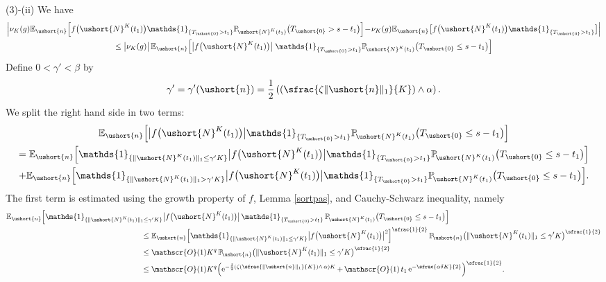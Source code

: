\documentclass[10pt]{amsart}
\newcommand{\Psfrac}[2]{(\sfrac{#1}{#2})}
\let\mathcal\mathscr
\numberwithin{equation}{section}
\theoremstyle{plain}
\theoremstyle{definition}
\newcommand{\proba}{{\mathbb{P}}}
\newcommand{\E}{{\mathbb{E}}}
\newcommand{\Oun}{\mathcal{O}(1)}
\newcommand{\un}{\mathds{1}}
\newcommand{\vecn}{\ushort{n}}
\newcommand{\veczer}{\ushort{0}}
\newcommand{\leproc}{\ushort{N}^{K}}
\newcommand{\sleproc}{\ushort{N}^{K}}
\newcommand{\nuk}{\nu_{K}}\let\snuk\nuk
\newcommand{\e}{\operatorname{e}}
\newcommand{\norm}[1]{\|#1\|_{1}}\let\snorm\norm
\begin{document}
(3)-(ii) We have
\begin{multline*}
\Bigl|\nuk(g) \E_{\vecn}\Bigl[
f\bigl(\leproc(t_{1})\bigr)\un_{\{T_{\veczer}>t_{1}\}}
\proba_{\!\sleproc(t_{1})}\bigl(T_{\veczer}>s-t_{1}\bigr)\Bigr]\!-\!\nuk(g) \E_{\vecn}\bigl[f\bigl(\leproc(t_{1})\bigr)\un_{\{T_{\veczer}>t_{1}\}}\bigr]\Bigr|\\
\le \big|\nuk(g)\big|\, \E_{\vecn}\Bigl[
\big|f\bigl(\leproc(t_{1})\bigr)\big|\;\un_{\{T_{\veczer}>t_{1}\}}
\proba_{\!\sleproc(t_{1})}\bigl(T_{\veczer}\le s-t_{1}\bigr)\Bigr]
\end{multline*}
Define $0<\gamma'<\beta$ by
\[
\gamma'=\gamma'(\vecn)=\frac{1}{2} \left(\Psfrac{\zeta \norm{\vecn}}{K} \wedge \alpha\right).
\]
We split the right hand side in two terms:
\begin{multline*}
\E_{\vecn}\Bigl[
\big|f\bigl(\leproc(t_{1})\bigr)\big|\un_{\{T_{\veczer}>t_{1}\}}
\proba_{\!\sleproc(t_{1})}\bigl(T_{\veczer}\le s-t_{1}\bigr)\Bigr]\\
=\E_{\vecn}\Bigl[\un_{\{\|\sleproc(t_{1})\|_1\le \gamma' K\}}
\big|f\bigl(\leproc(t_{1})\bigr)\big|\un_{\{T_{\veczer}>t_{1}\}}
\proba_{\!\sleproc(t_{1})}\bigl(T_{\veczer}\le s-t_{1}\bigr)\Bigr] \\
+\E_{\vecn}\Bigl[\un_{\{\|\sleproc(t_{1})\|_1> \gamma' K\}}
\big|f\bigl(\leproc(t_{1})\bigr)\big|\un_{\{T_{\veczer}>t_{1}\}}
\proba_{\!\sleproc(t_{1})}\bigl(T_{\veczer}\le s-t_{1}\bigr)\Bigr].
\end{multline*}
The first term is estimated using the growth property of $f$, Lemma \ref{sortpas},
and Cauchy-Schwarz inequality, namely
\begin{align*}
\E_{\vecn}\Bigl[\un_{\{\|\sleproc(t_{1})\|_1\le \gamma' K\}}&\big|f\bigl(\leproc(t_{1})\bigr)\big|\,
\un_{\{T_{\veczer}>t_{1}\}}\,\proba_{\!\sleproc(t_{1})}\bigl(T_{\veczer}\le s-t_{1}\bigr)\Bigr]\\
& \hspace*{-1cm}\le \E_{\vecn}\Bigl[\un_{\{\|\sleproc(t_{1})\|_1\le \gamma' K\}}
\big|f\bigl(\leproc(t_{1})\bigr)\big|^2\Bigr]^{\sfrac{1}{2}}\,\proba_{\!\vecn}\bigl(\|\leproc(t_{1})\|_1\le \gamma'K\bigr)^{\sfrac{1}{2}}\\
& \hspace*{-1cm}\le \Oun K^{q}\,\proba_{\!\vecn}\bigl(\|\leproc(t_{1})\|_1\le\gamma'K\bigr)^{\sfrac{1}{2}} \\
& \hspace*{-1cm}\le \Oun K^{q}\Bigl(\e^{-\frac{\delta}{2}\left(\zeta\Psfrac{\|\vecn\|_{1}}{K}\wedge\,\alpha\right)K}
+\,\Oun\, t_1 \e^{-\sfrac{\alpha\delta K}{2}} \Bigr)^{\sfrac{1}{2}}.
\end{align*}
\end{document}
